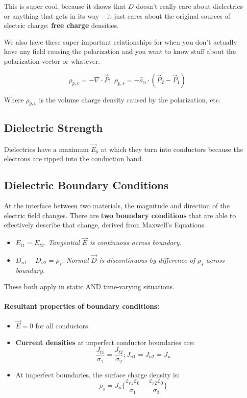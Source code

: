 \documentclass[a4paper,12pt]{report}
\begin{document}
This is super cool, because it shows that $D$ doesn't really care about dielectrics or anything that gets in its way -- it just cares about the original sources of electric charge: \textbf{free charge} densities. 

We also have these super important relationships for when you don't actually have any field causing the polarization and you want to know stuff about the polarization vector or whatever. 

$$\rho_{p, v} = -\nabla \cdot \vec P; \,\, \rho_{p, s} = -\hat a_n \cdot (\vec P_2 - \vec P_1)$$

Where $\rho_{p, v}$ is the volume charge density caused by the polarization, etc.  




\subsection{Dielectric Strength}

Dielectrics have a maximum $\vec{E}_b$ at which they turn into conductors because the electrons are ripped into the conduction band.

\subsection{Dielectric Boundary Conditions}

At the interface between two materials, the magnitude and direction of the electric field changes. There are \textbf{two boundary conditions} that are able to effectively describe that change, derived from Maxwell's Equations.

\begin{itemize}
\item $E_{t1} = E_{t2}$. \textit{Tangential $\vec{E}$ is continuous across boundary}.
\item $D_{n1} - D_{n2} = \rho_s$. \textit{Normal $\vec{D}$ is discontinuous by difference of $\rho_s$ across boundary}.
\end{itemize}

These both apply in static AND time-varying situations.

\paragraph{Resultant properties of boundary conditions: } 
\begin{itemize}
\item $\vec{E} = 0$ for all conductors.
\item \textbf{Current densities} at imperfect conductor boundaries are: $$\frac{J_{t1}}{\sigma_1} = \frac{J_{t2}}{\sigma_2}; J_{n1} = J_{n2} = J_n$$
\item At imperfect boundaries, the surface charge density is: $$\rho_s = J_n\{ \frac{\varepsilon_{r1}\varepsilon_0}{\sigma_1} - \frac{\varepsilon_{r2}\varepsilon_0}{\sigma_2} \}$$
\end{itemize}
\end{document}
